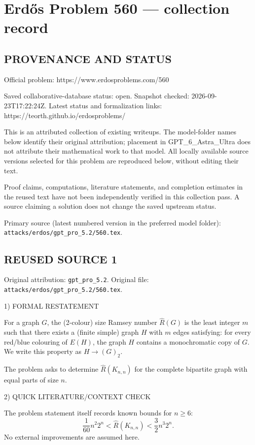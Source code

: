 \section*{Erd\H{o}s Problem 560 --- collection record}

\subsection*{PROVENANCE AND STATUS}
Official problem: https://www.erdosproblems.com/560

Saved collaborative-database status: open.
Snapshot checked: 2026-09-23T17:22:24Z.
Latest status and formalization links: https://teorth.github.io/erdosproblems/

This is an attributed collection of existing writeups. The model-folder names below identify their original attribution; placement in GPT\_6\_Astra\_Ultra does not attribute their mathematical work to that model. All locally available source versions selected for this problem are reproduced below, without editing their text.

Proof claims, computations, literature statements, and completion estimates in the reused text have not been independently verified in this collection pass. A source claiming a solution does not change the saved upstream status.

Primary source (latest numbered version in the preferred model folder): \texttt{attacks/erdos/gpt\_pro\_5.2/560.tex}.

\subsection*{REUSED SOURCE 1}
Original attribution: \texttt{gpt\_pro\_5.2}.
Original file: \texttt{attacks/erdos/gpt\_pro\_5.2/560.tex}.


1) FORMAL RESTATEMENT

For a graph $G$, the (2-colour) size Ramsey number $\hat R(G)$ is the least integer $m$ such that there exists a (finite simple) graph $H$ with $m$ edges satisfying:
for every red/blue colouring of $E(H)$, the graph $H$ contains a monochromatic copy of $G$.
We write this property as $H\to (G)_2$.

The problem asks to determine $\hat R(K_{n,n})$ for the complete bipartite graph with equal parts of size $n$.

2) QUICK LITERATURE/CONTEXT CHECK

The problem statement itself records known bounds for $n\ge 6$:
\[
\frac{1}{60}n^2 2^n < \hat R(K_{n,n}) < \frac{3}{2}n^3 2^n.
\]
No external improvements are assumed here.

